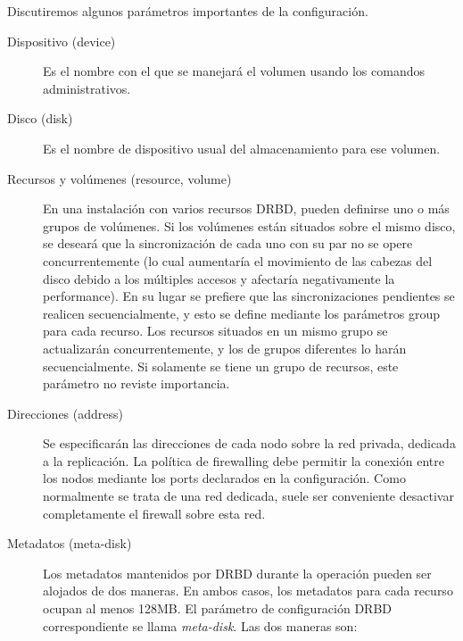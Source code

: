 Discutiremos algunos parámetros importantes de la configuración.
\begin{description}
	\item [Dispositivo (device)] Es el nombre con el que se manejará el volumen usando los comandos administrativos.
	\item [Disco (disk)] Es el nombre de dispositivo usual del almacenamiento para ese volumen. 
	\item [Recursos y volúmenes (resource, volume)] En una instalación con varios recursos DRBD, pueden definirse uno o más grupos de volúmenes. Si los volúmenes están situados sobre el mismo disco, se deseará que la sincronización de cada uno con su par no se opere concurrentemente (lo cual aumentaría el movimiento de las cabezas del disco debido a los múltiples accesos y afectaría negativamente la performance). En su lugar se prefiere que las sincronizaciones pendientes se realicen secuencialmente, y esto se define mediante los parámetros group para cada recurso. Los recursos situados en un mismo grupo se actualizarán concurrentemente, y los de grupos diferentes lo harán secuencialmente. Si solamente se tiene un grupo de recursos, este parámetro no reviste importancia.


% 
	\item [Direcciones (address)] Se especificarán las direcciones de cada nodo sobre la red privada, dedicada a la replicación. La política de firewalling debe permitir la conexión entre los nodos mediante los ports declarados en la configuración. Como normalmente se trata de una red dedicada, suele ser conveniente desactivar completamente el firewall sobre esta red.

	\item [Metadatos (meta-disk)] %

	Los metadatos mantenidos por DRBD durante la operación pueden ser alojados de dos maneras. En ambos casos, los metadatos para cada recurso ocupan al menos 128MB. El parámetro de configuración DRBD correspondiente se llama \textit{meta-disk}. Las dos maneras son:


\end{description}
